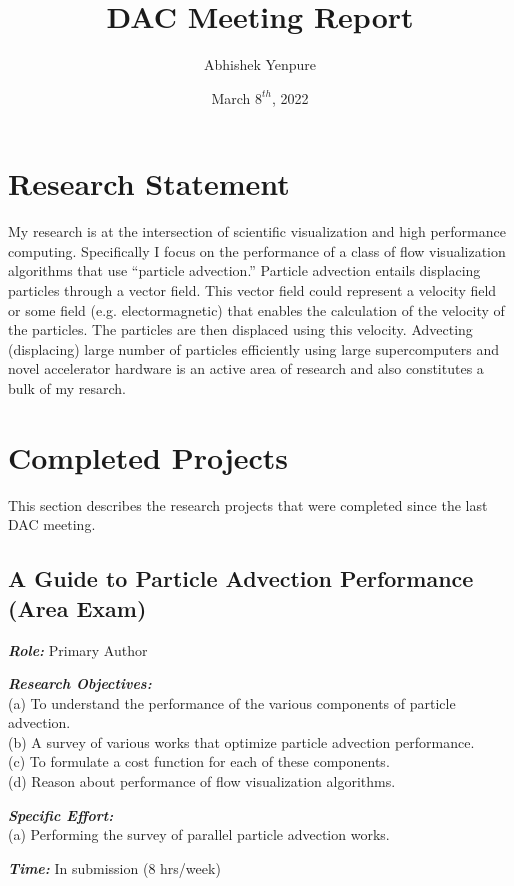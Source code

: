 \documentclass{article}
\title{DAC Meeting Report}
\author{Abhishek Yenpure}
\date{March $8^{th}$, 2022}
\newcommand{\boit}[1]{\textbf{\textit{#1}}}
\begin{document}
\maketitle

\section{Research Statement}

My research is at the intersection of scientific visualization and high performance computing.
%
Specifically I focus on the performance of a class of flow visualization algorithms that use ``particle advection.''
%
Particle advection entails displacing particles through a vector field.
%
This vector field could represent a velocity field or some field (e.g. electormagnetic)
that enables the calculation of the velocity of the particles.
%
The particles are then displaced using this velocity.
%
Advecting (displacing) large number of particles efficiently using large supercomputers and novel
accelerator hardware is an active area of research and also constitutes a bulk of my resarch.

\section{Completed Projects}

This section describes the research projects that were completed since the last DAC meeting.

\subsection{A Guide to Particle Advection Performance (Area Exam)}
\noindent \boit{Role:} Primary Author

\noindent \boit{Research Objectives:}
\\
\noindent
(a) To understand the performance of the various components of particle advection.
\\
(b) A survey of various works that optimize particle advection performance.
\\
(c) To formulate a cost function for each of these components.
\\
(d) Reason about performance of flow visualization algorithms.

\noindent \boit{Specific Effort:}
\\
\noindent
(a) Performing the survey of parallel particle advection works.

\noindent \boit{Time:} In submission (8 hrs/week)
\end{document}
